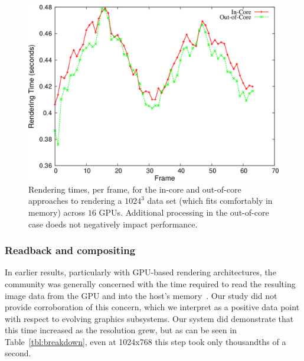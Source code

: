 \begin{figure}
  \includegraphics[width=\linewidth]{images/multiscale/ooc}
  \caption{Rendering times, per frame, for the in-core and out-of-core
  approaches to rendering a $1024^3$ data set (which fits comfortably
  in memory) across $16$ GPUs.  Additional processing in the
  out-of-core case doeds not negatively impact performance.}
  \label{fig:ooc}
\end{figure}

\subsubsection{Readback and compositing}

In earlier results, particularly with GPU-based rendering
architectures, the community was generally concerned with the time
required to read the resulting image data from the GPU and into the
host's
memory~\cite{Marchesin:2008:MultiGPU}.  Our study did not provide
corroboration of this concern, which we interpret as a positive data
point with respect to evolving graphics subsystems.  Our system did
demonstrate that this time increased as the resolution grew, but as can
be seen
in Table~\ref{tbl:breakdown}, even at 1024x768 this step took only
thousandths of a second.

